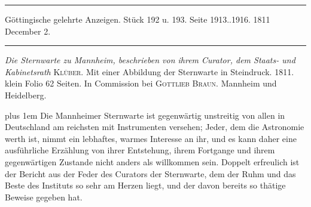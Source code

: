 \par\bigskip
\hypertarget{native-541-lower}{}\label{native-541-lower}
\begin{center}
\parbox{.92\linewidth}{\centering\small
\rule{\linewidth}{.3pt}\par\smallskip
Göttingische gelehrte Anzeigen. Stück 192 u. 193. Seite 1913..1916. 1811 December 2.\par\smallskip
\rule{\linewidth}{.3pt}}
\end{center}
\par\medskip

\emph{Die Sternwarte zu Mannheim, beschrieben von ihrem Curator, dem Staats- und Kabinetsrath} \textsc{Klüber}. Mit einer Abbildung der Sternwarte in Steindruck. 1811. klein Folio 62 Seiten. In Commission bei \textsc{Gottlieb Braun}. Mannheim und Heidelberg.

{\rightskip=0pt plus 1em
Die Mannheimer Sternwarte ist gegenwärtig unstreitig von allen in Deutschland am reichsten mit Instrumenten versehen; Jeder, dem die Astronomie werth ist, nimmt ein lebhaftes, warmes Interesse an ihr, und es kann daher eine ausführliche Erzählung von ihrer Entstehung, ihrem Fortgange und ihrem gegenwärtigen Zustande nicht anders als willkommen sein. Doppelt erfreulich ist der Bericht aus der Feder des Curators der Sternwarte, dem der Ruhm und das Beste des Instituts so sehr am Herzen liegt, und der davon bereits so thätige Beweise gegeben hat.\par}

